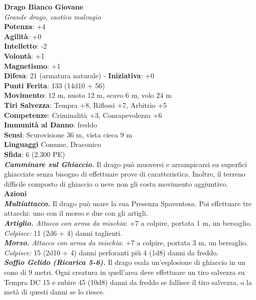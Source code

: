 \begin{multicols}{2}
\medskip\textbf{Drago Bianco Giovane}\\
\emph{Grande drago, caotico malvagio} \\
\textbf{Potenza}: +4 \\
\textbf{Agilità}: +0 \\
\textbf{Intelletto}: -2\\
\textbf{Volontà}: +1\\
\textbf{Magnetismo}: +1\\
\textbf{Difesa}: 21 (armatura naturale) - \textbf{Iniziativa}: +0\\
\textbf{Punti Ferita}: 133 (14d10 + 56)\\
\textbf{Movimento}: 12 m, nuoto 12 m, scavo 6 m, volo 24 m\\
\textbf{Tiri Salvezza}: Tempra +8, Riflessi +7, Arbitrio +5\\
\textbf{Competenze}: Criminalità +3, Consapevolezza +6\\
\textbf{Immunità al Danno}: freddo\\
\textbf{Sensi}: Scurovisione 36 m, vista cieca 9 m\\
\textbf{Linguaggi} Comune, Draconico\\
\textbf{Sfida}: 6 (2.300 PE)\smallskip\\
\emph{\textbf{Camminare sul Ghiaccio.}} Il drago può muoversi e arrampicarsi su superfici ghiacciate senza bisogno di effettuare prove di caratteristica. Inoltre, il terreno difficile composto di ghiaccio o neve non gli costa movimento aggiuntivo.\\
\smallskip\textbf{Azioni}\\
\emph{\textbf{Multiattacco.}} Il drago può usare la sua Presenza Spaventosa. Poi effettuare tre attacchi: uno con il morso e due con gli artigli.\\
\emph{\textbf{Artiglio.} Attacco con arma da mischia}: +7 a colpire, portata 1 m, un bersaglio.\\
\emph{Colpisce:} 11 (2d6 + 4) danni taglienti.\\
\emph{\textbf{Morso.} Attacco con arma da mischia}: +7 a colpire, portata 3 m, un bersaglio.\\
\emph{Colpisce:} 15 (2d10 + 4) danni perforanti più 4 (1d8) danni da freddo.\\
\emph{\textbf{Soffio Gelido (Ricarica 5-6).}} Il drago esala un'esplosione di ghiaccio in un cono di 9 metri. Ogni creatura in quell'area deve effettuare un tiro salvezza su Tempra DC 15 e subire 45 (10d8) danni da freddo se fallisce il tiro salvezza, o la metà di questi danni se lo riesce.\\

\end{multicols}
